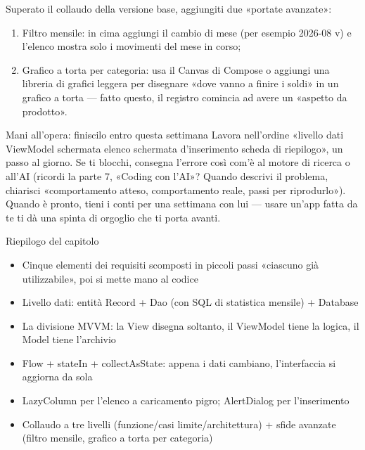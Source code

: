 Superato il collaudo della versione base, aggiungiti due «portate avanzate»:

\begin{enumerate}
  \item Filtro mensile: in cima aggiungi il cambio di mese (per esempio 2026-08 v) e l'elenco mostra solo i movimenti del mese in corso;
  \item Grafico a torta per categoria: usa il Canvas di Compose o aggiungi una libreria di grafici leggera per disegnare «dove vanno a finire i soldi» in un grafico a torta — fatto questo, il registro comincia ad avere un «aspetto da prodotto».
\end{enumerate}

\begin{tcbpractice}{Mani all'opera: finiscilo entro questa settimana}
Lavora nell'ordine «livello dati ViewModel schermata elenco schermata d'inserimento scheda di riepilogo», un passo al giorno. Se ti blocchi, consegna l'errore così com'è al motore di ricerca o all'AI (ricordi la parte 7, «Coding con l'AI»? Quando descrivi il problema, chiarisci «comportamento atteso, comportamento reale, passi per riprodurlo»). Quando è pronto, tieni i conti per una settimana con lui — usare un'app fatta da te ti dà una spinta di orgoglio che ti porta avanti.

\end{tcbpractice}

\begin{tcbsummary}{Riepilogo del capitolo}
\begin{itemize}
  \item Cinque elementi dei requisiti scomposti in piccoli passi «ciascuno già utilizzabile», poi si mette mano al codice
  \item Livello dati: entità Record + Dao (con SQL di statistica mensile) + Database
  \item La divisione MVVM: la View disegna soltanto, il ViewModel tiene la logica, il Model tiene l'archivio
  \item Flow + stateIn + collectAsState: appena i dati cambiano, l'interfaccia si aggiorna da sola
  \item LazyColumn per l'elenco a caricamento pigro; AlertDialog per l'inserimento
  \item Collaudo a tre livelli (funzione/casi limite/architettura) + sfide avanzate (filtro mensile, grafico a torta per categoria)
\end{itemize}

\end{tcbsummary}
